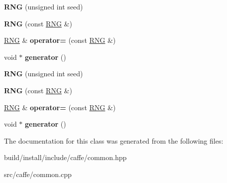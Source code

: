 \begin{DoxyCompactItemize}
\item 
\mbox{\label{classcaffe_1_1_caffe_1_1_r_n_g_a0b676deb529cd8b60b58c527c53a2130}} 
{\bfseries R\+NG} (unsigned int seed)
\item 
\mbox{\label{classcaffe_1_1_caffe_1_1_r_n_g_a1c16756c9b842bf803d1203e6d397b98}} 
{\bfseries R\+NG} (const \mbox{\hyperlink{classcaffe_1_1_caffe_1_1_r_n_g}{R\+NG}} \&)
\item 
\mbox{\label{classcaffe_1_1_caffe_1_1_r_n_g_a8369fd231a12f34d39c85cbcce69b847}} 
\mbox{\hyperlink{classcaffe_1_1_caffe_1_1_r_n_g}{R\+NG}} \& {\bfseries operator=} (const \mbox{\hyperlink{classcaffe_1_1_caffe_1_1_r_n_g}{R\+NG}} \&)
\item 
\mbox{\label{classcaffe_1_1_caffe_1_1_r_n_g_a4cbd9a29a1fe7220d16e8751cbb55560}} 
void $\ast$ {\bfseries generator} ()
\item 
\mbox{\label{classcaffe_1_1_caffe_1_1_r_n_g_a0b676deb529cd8b60b58c527c53a2130}} 
{\bfseries R\+NG} (unsigned int seed)
\item 
\mbox{\label{classcaffe_1_1_caffe_1_1_r_n_g_a1c16756c9b842bf803d1203e6d397b98}} 
{\bfseries R\+NG} (const \mbox{\hyperlink{classcaffe_1_1_caffe_1_1_r_n_g}{R\+NG}} \&)
\item 
\mbox{\label{classcaffe_1_1_caffe_1_1_r_n_g_a6e4d1ddefee9bd43bd7552b83f0e591f}} 
\mbox{\hyperlink{classcaffe_1_1_caffe_1_1_r_n_g}{R\+NG}} \& {\bfseries operator=} (const \mbox{\hyperlink{classcaffe_1_1_caffe_1_1_r_n_g}{R\+NG}} \&)
\item 
\mbox{\label{classcaffe_1_1_caffe_1_1_r_n_g_a9ed3e368789d46ed86e03778f126b490}} 
void $\ast$ {\bfseries generator} ()
\end{DoxyCompactItemize}


The documentation for this class was generated from the following files\+:\begin{DoxyCompactItemize}
\item 
build/install/include/caffe/common.\+hpp\item 
src/caffe/common.\+cpp\end{DoxyCompactItemize}
